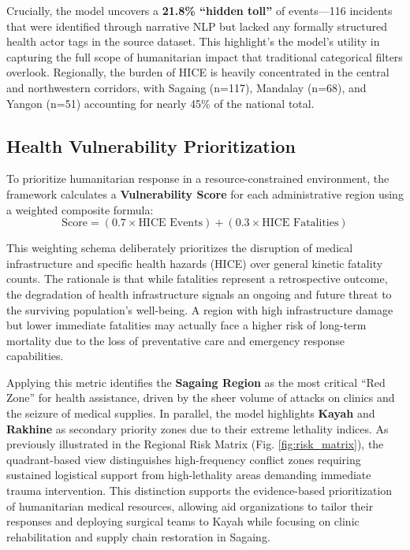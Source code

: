 \documentclass[conference]{IEEEtran}
\begin{document}
Crucially, the model uncovers a \textbf{21.8\% ``hidden toll''} of events—116 incidents that were identified through narrative NLP but lacked any formally structured health actor tags in the source dataset. This highlight's the model's utility in capturing the full scope of humanitarian impact that traditional categorical filters overlook. Regionally, the burden of HICE is heavily concentrated in the central and northwestern corridors, with Sagaing (n=117), Mandalay (n=68), and Yangon (n=51) accounting for nearly 45\% of the national total.

\subsection{Health Vulnerability Prioritization}
To prioritize humanitarian response in a resource-constrained environment, the framework calculates a \textbf{Vulnerability Score} for each administrative region using a weighted composite formula: 
\[
    \text{Score} = (0.7 \times \text{HICE Events}) + (0.3 \times \text{HICE Fatalities})
\]

This weighting schema deliberately prioritizes the disruption of medical infrastructure and specific health hazards (HICE) over general kinetic fatality counts. 
The rationale is that while fatalities represent a retrospective outcome, the degradation of health infrastructure signals an ongoing and future threat to the surviving population's well-being. A region with high infrastructure damage but lower immediate fatalities may actually face a higher risk of long-term mortality due to the loss of preventative care and emergency response capabilities. 

Applying this metric identifies the \textbf{Sagaing Region} as the most critical ``Red Zone'' for health assistance, driven by the sheer volume of attacks on clinics and the seizure of medical supplies. In parallel, the model highlights \textbf{Kayah} and \textbf{Rakhine} as secondary priority zones due to their extreme lethality indices. As previously illustrated in the Regional Risk Matrix (Fig. \ref{fig:risk_matrix}), the quadrant-based view distinguishes high-frequency conflict zones requiring sustained logistical support from high-lethality areas demanding immediate trauma intervention. This distinction supports the evidence-based prioritization of humanitarian medical resources, allowing aid organizations to tailor their responses and deploying surgical teams to Kayah while focusing on clinic rehabilitation and supply chain restoration in Sagaing. 
\end{document}
